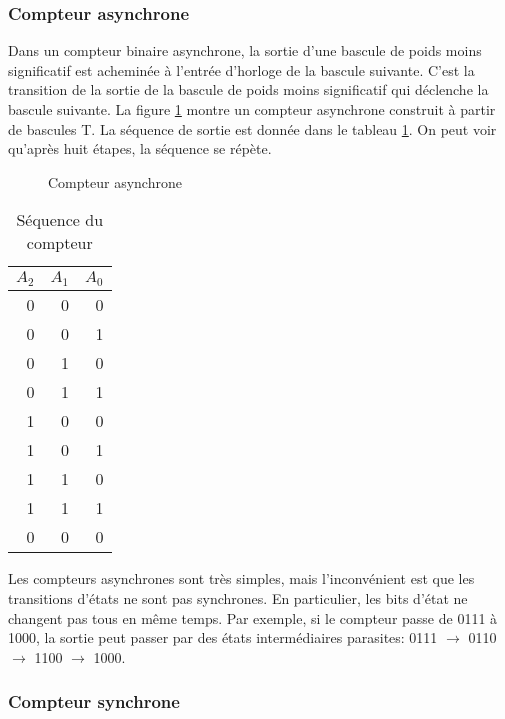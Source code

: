 \documentclass[11pt]{article}
\begin{document}
\subsubsection{Compteur asynchrone}
\label{sec:orgf5a36cb}

Dans un compteur binaire asynchrone, la sortie d'une bascule de poids
moins significatif est acheminée à l'entrée d'horloge de la bascule
suivante. C'est la transition de la sortie de la bascule de poids
moins significatif qui déclenche la bascule suivante. La figure
\ref{fig:org8a04a59} montre un compteur asynchrone construit à partir de
bascules T. La séquence de sortie est donnée dans le tableau
\ref{tab:org771d3b0}. On peut voir qu'après huit étapes, la séquence se
répète.

\begin{figure}[htbp]
\centering

\caption{\label{fig:org8a04a59}Compteur asynchrone}
\end{figure}

\begin{table}[htbp]
\caption{\label{tab:org771d3b0}Séquence du compteur}
\centering
\begin{tabular}{rrr}
\(A_2\) & \(A_1\) & \(A_0\)\\
\hline
0 & 0 & 0\\
0 & 0 & 1\\
0 & 1 & 0\\
0 & 1 & 1\\
1 & 0 & 0\\
1 & 0 & 1\\
1 & 1 & 0\\
1 & 1 & 1\\
0 & 0 & 0\\
\end{tabular}
\end{table}

Les compteurs asynchrones sont très simples, mais l'inconvénient est
que les transitions d'états ne sont pas synchrones. En particulier,
les bits d'état ne changent pas tous en même temps. Par exemple, si le
compteur passe de 0111 à 1000, la sortie peut passer par des états
intermédiaires parasites: 0111 \(\rightarrow\) 0110 \(\rightarrow\) 1100
\(\rightarrow\) 1000.

\subsubsection{Compteur synchrone}
\label{sec:orgdb9ade0}
\end{document}
